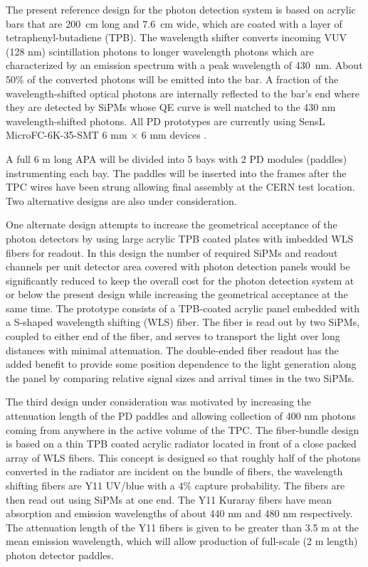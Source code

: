 The present reference design for the photon detection system is based on acrylic bars that are 200~cm long and 7.6~cm wide, which are coated with a layer of tetraphenyl-butadiene (TPB). The wavelength shifter converts incoming VUV (128 nm) scintillation photons
to longer wavelength photons which are characterized by an emission spectrum with a peak wavelength of 430~nm.
About 50\% of the converted photons will be emitted into the bar.
  A fraction of the wavelength-shifted optical photons are internally reflected to the bar's end where they are detected by SiPMs whose QE curve is well matched to the 430 nm wavelength-shifted photons. All PD prototypes are currently using SensL MicroFC-6K-35-SMT 6 mm $\times$ 6 mm devices \cite{sensl}. 

A full 6 m long APA will be divided into 5 bays with 2 PD modules (paddles) instrumenting each bay. The paddles will be inserted into the frames after the TPC wires have been strung allowing  final assembly at the CERN test location. Two alternative designs are also under consideration. 


One alternate design attempts to increase the geometrical acceptance of the photon detectors by using large acrylic TPB coated plates with imbedded WLS fibers for readout. In this design the number of required SiPMs and readout channels per unit detector area covered with photon detection panels would be significantly reduced to keep the overall cost for the photon detection system at or below the present design while increasing the geometrical acceptance at the same time. The prototype consists of a TPB-coated acrylic panel embedded with a S-shaped wavelength shifting (WLS) fiber. The fiber is read out by two SiPMs, coupled to either end of the fiber, and serves to transport the light over long distances with minimal attenuation. The double-ended fiber readout has the added benefit to provide some position dependence to the light generation along the panel by comparing relative signal sizes and arrival times in the two SiPMs. 



The third design under consideration was motivated by increasing the attenuation length of the PD paddles and allowing collection of 400 nm photons coming from anywhere in the active volume of the TPC.  The fiber-bundle design is based on a thin TPB coated acrylic radiator located in front of a close packed array of WLS fibers. This concept is designed so that roughly half of the photons converted in the radiator are incident on the bundle of fibers, the wavelength shifting fibers are Y11 UV/blue with a 4\% capture probability. The fibers are then read out using SiPMs at one end. The Y11  Kuraray fibers have mean absorption and emission wavelengths of about 440 nm and 480 nm respectively.  The attenuation length of the Y11 fibers is given to be greater than 3.5 m at the mean emission wavelength, which will allow production of full-scale (2 m length) photon detector paddles.


